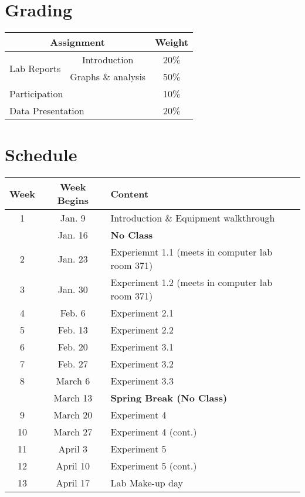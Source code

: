 \section*{Grading}

\begin{tabular}{ |l|c|c| } 
 \hline
 \multicolumn{2}{|c|}{\textbf{Assignment}} & \textbf{Weight} \\ 
 \hline
 \multirow{2}{*}{Lab Reports} & Introduction & 20\% \\
 \cline{2-3}
                              & Graphs \& analysis & 50\% \\ 
 \hline 
 \multicolumn{2}{|l|}{Participation} & 10\% \\ 
 \hline
 \multicolumn{2}{|l|}{Data Presentation} & 20\% \\ 
 \hline
\end{tabular}

\newpage 

\section*{Schedule}

\begin{tabular}{ |c|c|l| } 
 \hline
 \textbf{Week} & \textbf{Week Begins} & \textbf{Content} \\ 
 \hline
 1 & Jan. 9 & Introduction \& Equipment walkthrough \\ 
 \hline 
    & Jan. 16 & \textbf{No Class} \\ 
 \hline
 2 & Jan. 23 & Experiemnt 1.1 (meets in computer lab room 371) \\ 
 \hline
 3 & Jan. 30 & Experiment 1.2 (meets in computer lab room 371)\\ 
 \hline
 4 & Feb. 6 & Experiment 2.1 \\ 
 \hline
 5 & Feb. 13 & Experiment 2.2 \\ 
 \hline
 6 & Feb. 20 & Experiment 3.1 \\ 
 \hline
 7 & Feb. 27 & Experiment 3.2 \\ 
 \hline
 8 & March 6 & Experiment 3.3 \\ 
 \hline
   & March 13 & \textbf{Spring Break (No Class)} \\ 
 \hline
 9 & March 20 & Experiment 4 \\ 
 \hline
 10 & March 27 & Experiment 4 (cont.) \\ 
 \hline
 11 & April 3 & Experiment 5 \\ 
 \hline
 12 & April 10 & Experiment 5 (cont.) \\ 
 \hline
 13 & April 17 & Lab Make-up day \\ 
 \hline
\end{tabular}

